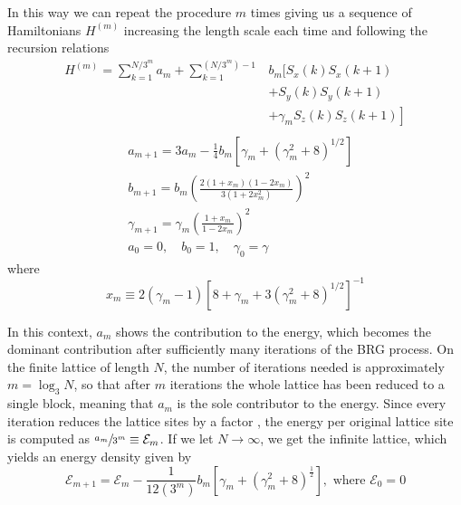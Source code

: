 \documentclass[../rsrg.tex,../../main.tex]{subfiles}
\begin{document}
In this way we can repeat the procedure $m$ times giving us a sequence of Hamiltonians $H^{(m)}$ increasing the length scale each time and following the recursion relations
\begin{equation}
\begin{split}
H^{(m)}=\sum_{k=1}^{N / 3^{m}} a_{m}+\sum_{k=1}^{\left(N / 3^{m}\right)-1} &b_{m}[S_{x}(k) S_{x}(k+1) \\
&+S_{y}(k) S_{y}(k+1) \\
&\left.+\gamma_{m} S_{z}(k) S_{z}(k+1)\right]\\
\end{split}
\label{eq:rg}
\end{equation}
\begin{equation*}
\begin{split}
&a_{m+1}=3 a_{m}-\frac{1}{4} b_{m}\left[\gamma_{m}+\left(\gamma_{m}^{2}+8\right)^{1 / 2}\right] \\
&b_{m+1}=b_{m}\left(\frac{2\left(1+x_{m}\right)\left(1-2 x_{m}\right)}{3\left(1+2 x_{m}^{2}\right)}\right)^{2} \\
&\gamma_{m+1}=\gamma_{m}\left(\frac{1+x_{m}}{1-2 x_{m}}\right)^{2} \\
&a_{0}=0, \quad b_{0}=1, \quad \gamma_{0}=\gamma
\end{split}
\end{equation*}
where
\begin{equation*}
x_{m} \equiv 2\left(\gamma_{m}-1\right)\left[8+\gamma_{m}+3\left(\gamma_{m}^{2}+8\right)^{1 / 2}\right]^{-1}
\end{equation*}

In this context, $a_{m}$ shows the contribution to the energy, which becomes the dominant contribution after sufficiently many iterations of the BRG process. On the finite lattice of length $N$, the number of iterations needed is approximately $m=\log_{3}N$\cite{rabin}, so that after $m$ iterations the whole lattice has been reduced to a single block, meaning that $a_{m}$ is the sole contributor to the energy. Since every iteration reduces the lattice sites by a factor , the energy per original lattice site is computed as $\sfrac{a_{m}}{3^{m}}\equiv \mathcal{E}_{m}$. If we let $N\to \infty$, we get the infinite lattice, which yields an energy density given by
\begin{equation}
    \mathcal{E}_{m+1}=\mathcal{E}_{m}-\frac{1}{12(3^{m})}b_{m}[\gamma_{m}+(\gamma_{m}^{2}+8)^{\frac{1}{2}}],\text{ where } \mathcal{E}_{0}=0
\end{equation}
\end{document}
